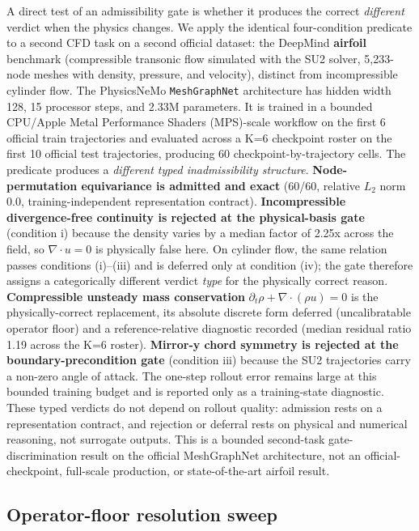 \documentclass[preprint,12pt]{elsarticle}
\begin{document}
A direct test of an admissibility gate is whether it produces the correct \emph{different} verdict when the physics changes. We apply the identical four-condition predicate to a second CFD task on a second official dataset: the DeepMind \textbf{airfoil} benchmark (compressible transonic flow simulated with the SU2 solver, 5{,}233-node meshes with density, pressure, and velocity), distinct from incompressible cylinder flow. The PhysicsNeMo \texttt{MeshGraphNet} architecture has hidden width 128, 15 processor steps, and 2.33M parameters. It is trained in a bounded CPU/Apple Metal Performance Shaders (MPS)-scale workflow on the first 6 official train trajectories and evaluated across a K=6 checkpoint roster on the first 10 official test trajectories, producing 60 checkpoint-by-trajectory cells. The predicate produces a \emph{different typed inadmissibility structure}. \textbf{Node-permutation equivariance is admitted and exact} (60/60, relative \(L_2\) norm 0.0, training-independent representation contract). \textbf{Incompressible divergence-free continuity is rejected at the physical-basis gate} (condition i) because the density varies by a median factor of 2.25x across the field, so $\nabla\cdot u=0$ is physically false here. On cylinder flow, the same relation passes conditions (i)--(iii) and is deferred only at condition (iv); the gate therefore assigns a categorically different verdict \emph{type} for the physically correct reason. \textbf{Compressible unsteady mass conservation} $\partial_t\rho+\nabla\cdot(\rho u)=0$ is the physically-correct replacement, its absolute discrete form deferred (uncalibratable operator floor) and a reference-relative diagnostic recorded (median residual ratio 1.19 across the K=6 roster). \textbf{Mirror-y chord symmetry is rejected at the boundary-precondition gate} (condition iii) because the SU2 trajectories carry a non-zero angle of attack. The one-step rollout error remains large at this bounded training budget and is reported only as a training-state diagnostic. These typed verdicts do not depend on rollout quality: admission rests on a representation contract, and rejection or deferral rests on physical and numerical reasoning, not surrogate outputs. This is a bounded second-task gate-discrimination result on the official MeshGraphNet architecture, not an official-checkpoint, full-scale production, or state-of-the-art airfoil result.

\subsection{Operator-floor resolution sweep}
\label{subsec:operator-floor-sweep}
\end{document}
